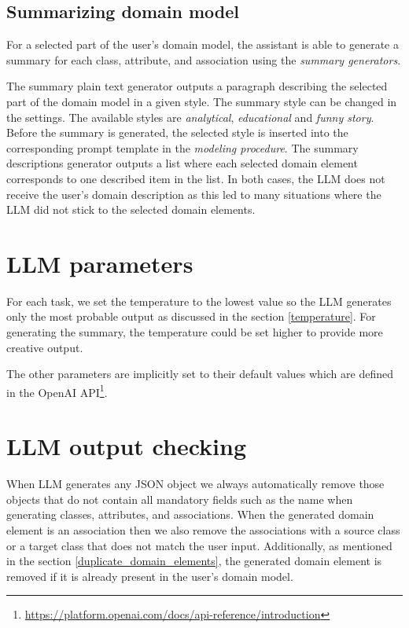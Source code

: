 \subsection{Summarizing domain model}
\label{sec:summarising_domain_model}

For a selected part of the user's domain model, the assistant is able to generate a summary for each class, attribute, and association using the \emph{summary generators}.

The summary plain text generator outputs a paragraph describing the selected part of the domain model in a given style. The summary style can be changed in the settings. The available styles are \textit{analytical}, \textit{educational} and \textit{funny story}. Before the summary is generated, the selected style is inserted into the corresponding prompt template in the \emph{modeling procedure}. The summary descriptions generator outputs a list where each selected domain element corresponds to one described item in the list. In both cases, the LLM does not receive the user's domain description as this led to many situations where the LLM did not stick to the selected domain elements.


\section{LLM parameters}

For each task, we set the temperature to the lowest value so the LLM generates only the most probable output as discussed in the section \ref{temperature}. For generating the summary, the temperature could be set higher to provide more creative output.

The other parameters are implicitly set to their default values which are defined in the OpenAI API\footnote{\url{https://platform.openai.com/docs/api-reference/introduction}}.


\section{LLM output checking}

When LLM generates any JSON object we always automatically remove those objects that do not contain all mandatory fields such as the name when generating classes, attributes, and associations. When the generated domain element is an association then we also remove the associations with a source class or a target class that does not match the user input. Additionally, as mentioned in the section \ref{duplicate_domain_elements}, the generated domain element is removed if it is already present in the user's domain model.


